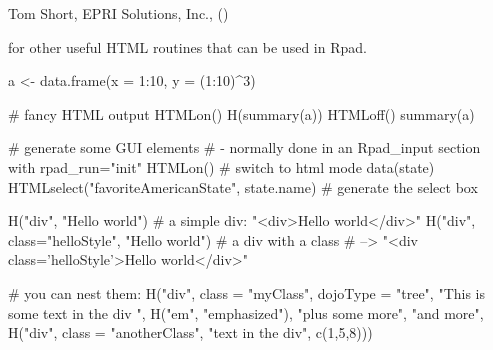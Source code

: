 \begin{Author}\relax
Tom Short, EPRI Solutions, Inc., ()
\end{Author}
\begin{SeeAlso}\relax
{} for other useful HTML routines that can be used in Rpad.
\end{SeeAlso}
\begin{Examples}
\begin{ExampleCode}
  a <- data.frame(x = 1:10, y = (1:10)^3)

  # fancy HTML output
  HTMLon()
  H(summary(a))
  HTMLoff()
  summary(a)

  # generate some GUI elements
  # - normally done in an Rpad_input section with rpad_run="init"
  HTMLon() # switch to html mode
  data(state)
  HTMLselect("favoriteAmericanState", state.name) # generate the select box

  H("div", "Hello world") # a simple div: "<div>Hello world</div>"
  H("div", class="helloStyle", "Hello world") # a div with a class
    # --> "<div class='helloStyle'>Hello world</div>"

  # you can nest them:
  H("div", class = "myClass", dojoType = "tree",
    "This is some text in the div ",  
    H("em", "emphasized"), "plus some more",
    "and more",
    H("div", class = "anotherClass",
      "text in the div",
      c(1,5,8)))
\end{ExampleCode}
\end{Examples}

